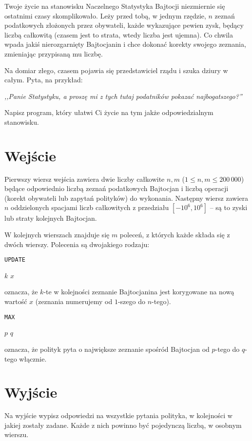 \documentclass{spiral-kurs}
\begin{document}
\makeheader
%


Twoje życie na stanowisku Naczelnego Statystyka Bajtocji niezmiernie
się ostatnimi czasy skomplikowało. Leży przed tobą, w jednym rzędzie, $n$ zeznań podatkowych złożonych przez obywateli, każde wykazujące
pewien zysk, będący liczbą całkowitą (czasem jest to strata, wtedy liczba jest ujemna).
Co chwila wpada jakiś nierozgarnięty Bajtocjanin i chce dokonać korekty swojego zeznania, zmieniając przypisaną mu liczbę.

Na domiar złego, czasem pojawia się przedstawiciel rządu i szuka dziury w całym. Pyta, na przykład:

{\it ,,Panie Statystyku, a proszę mi z tych tutaj podatników pokazać
najbogatszego?'' }

Napisz program, który ułatwi Ci życie na tym jakże odpowiedzialnym stanowisku.

    \section{Wejście}

Pierwszy wiersz wejścia zawiera dwie liczby całkowite $n, m$ ($1 \leq n,m
\leq 200\,000$) będące odpowiednio liczbą zeznań podatkowych
Bajtocjan i liczbą operacji (korekt obywateli lub zapytań polityków) do wykonania.
Następny wiersz zawiera $n$ oddzielonych spacjami liczb całkowitych z przedziału $[-10^6, 10^6]$ -- są to zyski lub straty kolejnych
Bajtocjan.


W kolejnych wierszach znajduje się $m$ poleceń, z których każde składa
się z dwóch wierszy. Polecenia są dwojakiego rodzaju:

\medskip
\texttt{UPDATE}

$k$ $x$
\medskip

oznacza, że $k$-te w kolejności zeznanie Bajtocjanina jest korygowane na
nową wartość $x$ (zeznania numerujemy od $1$-szego do $n$-tego).

\medskip
\texttt{MAX}

$p$ $q$
\medskip

oznacza, że polityk pyta o największe zeznanie spośród Bajtocjan od
$p$-tego do $q$-tego włącznie.



    \section{Wyjście}

Na wyjście wypisz odpowiedzi na wszystkie pytania polityka, w kolejności w jakiej zostały zadane. Każde z nich powinno być pojedynczą liczbą, w osobnym wierszu.

  
\end{document}
